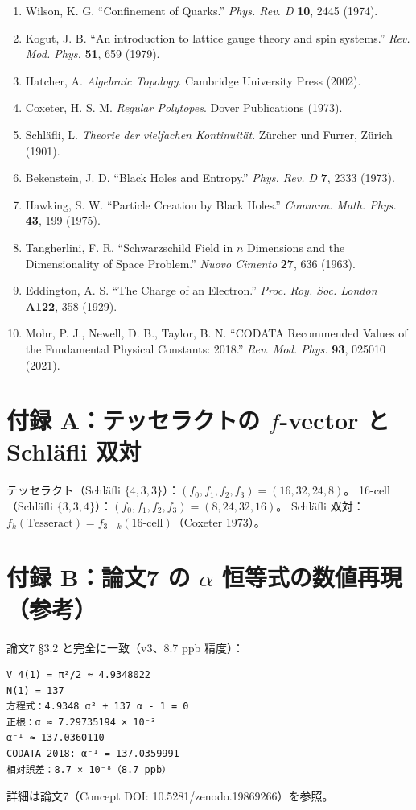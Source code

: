 \documentclass[a4paper,11pt]{ltjsarticle}
\begin{document}
\begin{enumerate}
\item Wilson, K. G. ``Confinement of Quarks.'' \textit{Phys. Rev. D} \textbf{10}, 2445 (1974).
\item Kogut, J. B. ``An introduction to lattice gauge theory and spin systems.'' \textit{Rev. Mod. Phys.} \textbf{51}, 659 (1979).
\item Hatcher, A. \textit{Algebraic Topology}. Cambridge University Press (2002).
\item Coxeter, H. S. M. \textit{Regular Polytopes}. Dover Publications (1973).
\item Schläfli, L. \textit{Theorie der vielfachen Kontinuität}. Zürcher und Furrer, Zürich (1901).
\item Bekenstein, J. D. ``Black Holes and Entropy.'' \textit{Phys. Rev. D} \textbf{7}, 2333 (1973).
\item Hawking, S. W. ``Particle Creation by Black Holes.'' \textit{Commun. Math. Phys.} \textbf{43}, 199 (1975).
\item Tangherlini, F. R. ``Schwarzschild Field in $n$ Dimensions and the Dimensionality of Space Problem.'' \textit{Nuovo Cimento} \textbf{27}, 636 (1963).
\item Eddington, A. S. ``The Charge of an Electron.'' \textit{Proc. Roy. Soc. London} \textbf{A122}, 358 (1929).
\item Mohr, P. J., Newell, D. B., Taylor, B. N. ``CODATA Recommended Values of the Fundamental Physical Constants: 2018.'' \textit{Rev. Mod. Phys.} \textbf{93}, 025010 (2021).
\end{enumerate}

\section*{付録 A：テッセラクトの $f$-vector と Schläfli 双対}

テッセラクト（Schläfli $\{4,3,3\}$）：$(f_0, f_1, f_2, f_3) = (16, 32, 24, 8)$。
16-cell（Schläfli $\{3,3,4\}$）：$(f_0, f_1, f_2, f_3) = (8, 24, 32, 16)$。
Schläfli 双対：$f_k(\text{Tesseract}) = f_{3-k}(\text{16-cell})$（Coxeter 1973）。

\section*{付録 B：論文7 の $\alpha$ 恒等式の数値再現（参考）}

論文7 §3.2 と完全に一致（v3、8.7 ppb 精度）：

\begin{verbatim}
V_4(1) = π²/2 ≈ 4.9348022
N(1) = 137
方程式：4.9348 α² + 137 α - 1 = 0
正根：α ≈ 7.29735194 × 10⁻³
α⁻¹ ≈ 137.0360110
CODATA 2018: α⁻¹ = 137.0359991
相対誤差：8.7 × 10⁻⁸（8.7 ppb）
\end{verbatim}

詳細は論文7（Concept DOI: 10.5281/zenodo.19869266）を参照。
\end{document}
